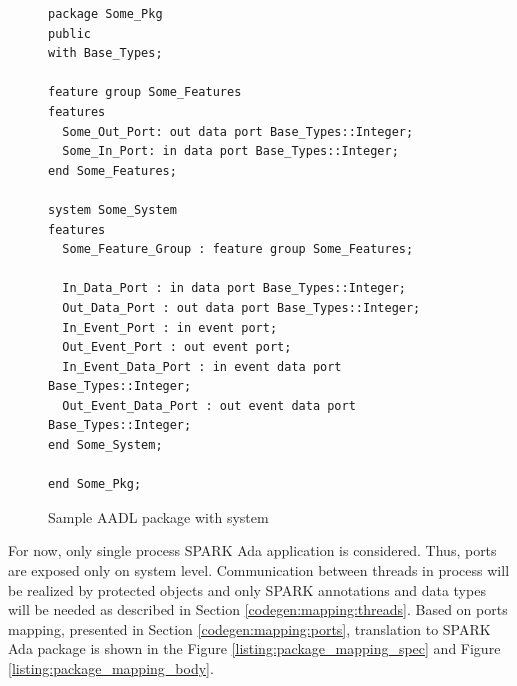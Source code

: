 \begin{figure}[ht]
\singlespacing
\begin{lstlisting}[language=aadl, frame=single, gobble=0]
package Some_Pkg
public
with Base_Types;

feature group Some_Features
features
  Some_Out_Port: out data port Base_Types::Integer;
  Some_In_Port: in data port Base_Types::Integer;
end Some_Features;

system Some_System
features
  Some_Feature_Group : feature group Some_Features;
  
  In_Data_Port : in data port Base_Types::Integer;
  Out_Data_Port : out data port Base_Types::Integer;
  In_Event_Port : in event port;
  Out_Event_Port : out event port;
  In_Event_Data_Port : in event data port Base_Types::Integer;
  Out_Event_Data_Port : out event data port Base_Types::Integer;
end Some_System;

end Some_Pkg;
\end{lstlisting}
\doublespacing
\caption{Sample AADL package with system}
\label{listing:aadl_sample}
\end{figure}

For now, only single process SPARK Ada application is considered. Thus, ports are exposed only on system level. Communication between threads in process will be realized by protected objects and only SPARK annotations and data types will be needed as described in Section \ref{codegen:mapping:threads}. Based on ports mapping, presented in Section \ref{codegen:mapping:ports}, translation to SPARK Ada package is shown in the Figure \ref{listing:package_mapping_spec} and Figure \ref{listing:package_mapping_body}. 

